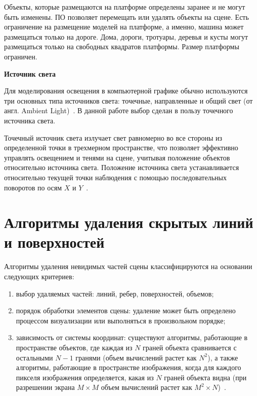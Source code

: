 Объекты, которые размещаются на платформе определены заранее и не могут быть изменены. ПО позволяет перемещать или удалять объекты на сцене. Есть ограничение на размещение моделей на платформе, а именно, машина может размещаться только на дороге. Дома, дороги, тротуары, деревья и кусты могут размещаться только на свободных квадратов платформы. Размер платформы ограничен.

\textbf{Источник света}

Для моделирования освещения в компьютерной графике обычно используются три основных типа источников света: точечные, направленные и общий свет (от англ. Ambient Light)~\cite{light}.
В данной работе выбор сделан в пользу точечного источника света.

Точечный источник света излучает свет равномерно во все стороны из определенной точки в трехмерном пространстве, что позволяет эффективно управлять освещением и тенями на сцене, учитывая положение объектов относительно источника света.
Положение источника света устанавливается относительно текущей точки наблюдения с помощью последовательных поворотов по осям $X$ и $Y$~\cite{light}.

\section{Алгоритмы удаления скрытых линий и поверхностей}




Алгоритмы удаления невидимых частей сцены классифицируются на основании следующих критериев:

\begin{enumerate}
	\item выбор удаляемых частей: линий, ребер, поверхностей, объемов;
	\item порядок обработки элементов сцены: удаление может быть определено процессом визуализации или выполняться в произвольном порядке;
	\item зависимость от системы координат: существуют алгоритмы, работающие в пространстве объектов, где каждая из $N$ граней объекта сравнивается с остальными $N - 1$ гранями (объем вычислений растет как $N^2$), а также алгоритмы, работающие в пространстве изображения, когда для каждого пикселя изображения определяется, какая из $N$ граней объекта видна (при разрешении экрана $M\times{M}$ объем вычислений растет как $M^2 \times N$)~\cite{del_line}.
\end{enumerate}

